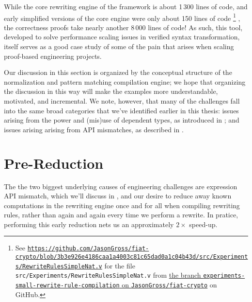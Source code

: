 While the core rewriting engine of the framework is about 1\,300 lines of code, and early simplified versions of the core engine were only about 150 lines of code%
\footnote{%
See \href{https://web.archive.org/web/20200716002534/https://github.com/JasonGross/fiat-crypto/blob/3b3e926e4186caa1a4003c81c65dad0a1c04b43d/src/Experiments/RewriteRulesSimpleNat.v}{\texttt{https://github.com/JasonGross/fiat-crypto/blob/3b3e926e4186caa1a4003c81c65dad0a1c04b43d/src/Experiments/RewriteRulesSimpleNat.v}} for the file \texttt{src/Experiments/RewriteRulesSimpleNat.v} from \href{https://github.com/JasonGross/fiat-crypto/tree/experiments-small-rewrite-rule-compilation}{the branch \texttt{experiments-small-rewrite-rule-compilation} on \texttt{JasonGross/fiat-crypto}} on GitHub.%
}%
, the correctness proofs take nearly another 8\,000 lines of code!
As such, this tool, developed to solve performance scaling issues in verified syntax transformation, itself serves as a good case study of some of the pain that arises when scaling proof-based engineering projects.

Our discussion in this section is organized by the conceptual structure of the normalization and pattern matching compilation engine;
we hope that organizing the discussion in this way will make the examples more understandable, motivated, and incremental.
We note, however, that many of the challenges fall into the same broad categories that we've identified earlier in this thesis:
issues arising from the power and (mis)use of dependent types, as introduced in ;
and issues arising arising from API mismatches, as described in .

\section{Pre-Reduction}\label{sec:rewriting-more:pre-reduction}
The the two biggest underlying causes of engineering challenges are expression API mismatch, which we'll discuss in , and our desire to reduce away known computations in the rewriting engine once and for all when compiling rewriting rules, rather than again and again every time we perform a rewrite.
In pratice, performing this early reduction nets us an approximately $2\times$ speed-up.

